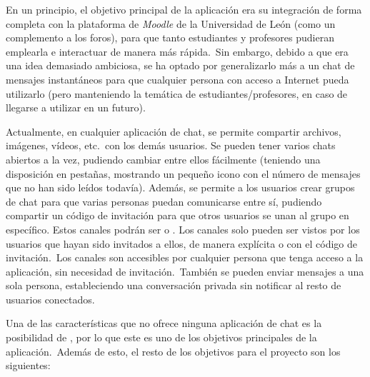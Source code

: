 En un principio, el objetivo principal de la aplicación era su integración de forma completa con la plataforma de
\textit{Moodle} de la Universidad de León (como un complemento a los foros), para que tanto estudiantes y profesores
pudieran emplearla e interactuar de manera más rápida.\ Sin embargo, debido a que era una idea demasiado ambiciosa,
se ha optado por generalizarlo más a un chat de mensajes instantáneos para que cualquier persona con acceso a
Internet pueda utilizarlo (pero manteniendo la temática de estudiantes/profesores, en caso de llegarse a utilizar en
un futuro).

Actualmente, en cualquier aplicación de chat, se permite compartir archivos, imágenes, vídeos, etc.\ con los demás
usuarios.
Se pueden tener varios chats abiertos a la vez, pudiendo cambiar entre ellos fácilmente (teniendo una disposición en
pestañas, mostrando un pequeño icono con el número de mensajes que no han sido leídos todavía).
Además, se permite a los usuarios crear grupos de chat para que varias personas puedan
comunicarse entre sí, pudiendo compartir un código de invitación para que otros usuarios se unan al grupo en específico.
Estos canales podrán ser  o .
Los canales  solo pueden ser vistos por los usuarios que hayan sido invitados a ellos, de manera
explícita o con el código de invitación.\ Los canales  son accesibles por cualquier persona que
tenga acceso a la aplicación, sin necesidad de invitación.\ También se pueden enviar mensajes a una sola persona,
estableciendo una conversación privada sin notificar al resto de usuarios conectados.

Una de las características que no ofrece ninguna aplicación de chat es la posibilidad de
, por lo que este es uno de los objetivos principales de la
aplicación.\ Además de esto, el resto de los objetivos para el proyecto son los siguientes:

